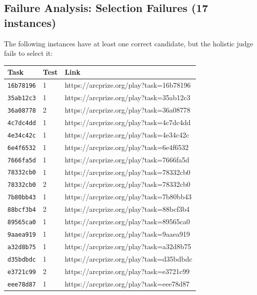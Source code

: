 \documentclass[10pt]{article}
\begin{document}
\hypertarget{failure-analysis-selection-failures-17-instances}{%
\subsection{Failure Analysis: Selection Failures (17
instances)}\label{failure-analysis-selection-failures-17-instances}}

The following instances have at least one correct candidate, but the
holistic judge fails to select it:

\begin{longtable}[]{@{}lll@{}}
\toprule\noalign{}
Task & Test & Link \\
\midrule\noalign{}
\endhead
\bottomrule\noalign{}
\endlastfoot
\texttt{16b78196} & 1 & https://arcprize.org/play?task=16b78196 \\
\texttt{35ab12c3} & 1 & https://arcprize.org/play?task=35ab12c3 \\
\texttt{36a08778} & 2 & https://arcprize.org/play?task=36a08778 \\
\texttt{4c7dc4dd} & 1 & https://arcprize.org/play?task=4c7dc4dd \\
\texttt{4e34c42c} & 1 & https://arcprize.org/play?task=4e34c42c \\
\texttt{6e4f6532} & 1 & https://arcprize.org/play?task=6e4f6532 \\
\texttt{7666fa5d} & 1 & https://arcprize.org/play?task=7666fa5d \\
\texttt{78332cb0} & 1 & https://arcprize.org/play?task=78332cb0 \\
\texttt{78332cb0} & 2 & https://arcprize.org/play?task=78332cb0 \\
\texttt{7b80bb43} & 1 & https://arcprize.org/play?task=7b80bb43 \\
\texttt{88bcf3b4} & 2 & https://arcprize.org/play?task=88bcf3b4 \\
\texttt{89565ca0} & 1 & https://arcprize.org/play?task=89565ca0 \\
\texttt{9aaea919} & 1 & https://arcprize.org/play?task=9aaea919 \\
\texttt{a32d8b75} & 1 & https://arcprize.org/play?task=a32d8b75 \\
\texttt{d35bdbdc} & 1 & https://arcprize.org/play?task=d35bdbdc \\
\texttt{e3721c99} & 2 & https://arcprize.org/play?task=e3721c99 \\
\texttt{eee78d87} & 1 & https://arcprize.org/play?task=eee78d87 \\
\end{longtable}
\end{document}
